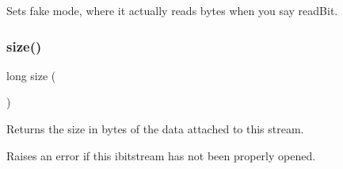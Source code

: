 Sets \textquotesingle{}fake\textquotesingle{} mode, where it actually reads bytes when you say read\+Bit. 

\mbox{\label{classibitstream_a22727e9c338fb1aaa6722031445373c3}} 
\subsubsection{\texorpdfstring{size()}{size()}}
{\footnotesize\ttfamily long size (\begin{DoxyParamCaption}{ }\end{DoxyParamCaption})}



Returns the size in bytes of the data attached to this stream. 

Raises an error if this ibitstream has not been properly opened. 